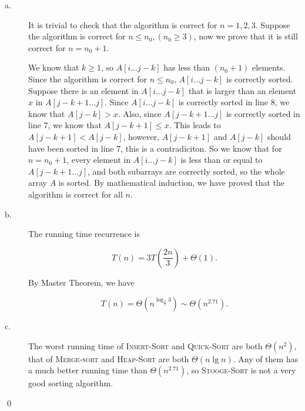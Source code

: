 \begin{description}
\item[a. \hspace{9pt}]

It is trivial to check that the algorithm is correct for $n = 1, 2, 3$. Suppose the algorithm is correct for $n \leq n_0, (n_0 \geq 3)$, now we prove that it is still correct for $n = n_0 + 1$.

We know that $k \geq 1$, so $A[i\ldots j - k]$ has less than $(n_0 + 1)$ elements. Since the algorithm is correct for $n \leq n_0$, $A[i \ldots j - k]$ is correctly sorted.
Suppose there is an element in $A[i \ldots j - k]$ that is larger than an element $x$ in $A[j - k + 1 \ldots j]$. Since $A[i \ldots j - k]$ is correctly sorted in line $8$, we know that 
$A[j - k]  > x$. Also, since $A[j -k + 1\ldots j]$ is correctly sorted in line $7$, we know that $A[j - k + 1] \leq x$. This leads to $A[j -k + 1] < A[j - k]$, however, $A[j - k + 1]$
and $A[j - k]$ should have been sorted in line $7$, this is a contradiciton. So we know that for $n = n_0 + 1$,  every element in $A[i \ldots j - k]$ is less than or equal to
$A[j -k +1 \ldots j]$, and both subarrays are correctly sorted, so the whole array $A$ is sorted. By mathematical induction, we have proved that the algorithm is correct for all $n$.

\item[b. \hspace{9pt}] The running time recurrence is

$$T(n) = 3 T\left(\frac{2n}{3}\right) + \Theta(1).$$

By Master Theorem, we have

$$T(n) = \Theta\left(n^{\log_{\frac{3}{2}}3}\right) \sim \Theta(n^{2.71}).$$

\item[c. \hspace{9pt}] The worst running time of \textsc{Insert-Sort} and \textsc{Quick-Sort} are both $\Theta(n^2)$, that of \textsc{Merge-sort} and \textsc{Heap-Sort}
are both $\Theta(n\lg n)$. Any of them has a much better running time than $\Theta(n^{2.71})$, so \textsc{Stooge-Sort} is not a very good sorting algorithm.

\end{description}
\qed


